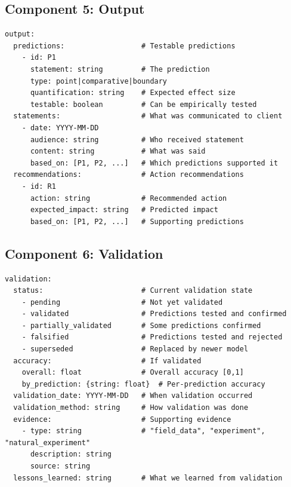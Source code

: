 \subsection{Component 5: Output}

\begin{tcolorbox}[colback=red!5!white, colframe=red!75!black,
    title=Schema: Output]
\begin{verbatim}
output:
  predictions:                  # Testable predictions
    - id: P1
      statement: string         # The prediction
      type: point|comparative|boundary
      quantification: string    # Expected effect size
      testable: boolean         # Can be empirically tested
  statements:                   # What was communicated to client
    - date: YYYY-MM-DD
      audience: string          # Who received statement
      content: string           # What was said
      based_on: [P1, P2, ...]   # Which predictions supported it
  recommendations:              # Action recommendations
    - id: R1
      action: string            # Recommended action
      expected_impact: string   # Predicted impact
      based_on: [P1, P2, ...]   # Supporting predictions
\end{verbatim}
\end{tcolorbox}

\subsection{Component 6: Validation}

\begin{tcolorbox}[colback=purple!5!white, colframe=purple!75!black,
    title=Schema: Validation]
\begin{verbatim}
validation:
  status:                       # Current validation state
    - pending                   # Not yet validated
    - validated                 # Predictions tested and confirmed
    - partially_validated       # Some predictions confirmed
    - falsified                 # Predictions tested and rejected
    - superseded                # Replaced by newer model
  accuracy:                     # If validated
    overall: float              # Overall accuracy [0,1]
    by_prediction: {string: float}  # Per-prediction accuracy
  validation_date: YYYY-MM-DD   # When validation occurred
  validation_method: string     # How validation was done
  evidence:                     # Supporting evidence
    - type: string              # "field_data", "experiment", "natural_experiment"
      description: string
      source: string
  lessons_learned: string       # What we learned from validation
\end{verbatim}
\end{tcolorbox}


